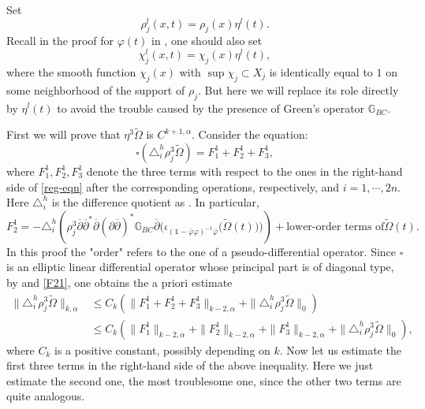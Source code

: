 \documentclass[12pt]{amsart}
\numberwithin{equation}{section}
\renewcommand{\1}{\mathds{1}}
\newcommand{\G}{\mathbb{G}}
\newcommand{\db}{\overline{\partial}}
\renewcommand{\>}{\rightarrow}
\newcommand{\p}{\partial}
\def\p{\partial}
\def\b{\bar}
\begin{document}
Set
\begin{equation}\label{ro-eta}
\rho_j^l(x,t)=\rho_j(x)\eta^l(t).
\end{equation}
Recall in the proof for $\varphi(t)$ in \cite[Appendix.\S 8]{k}, one
should also set
$$\chi_j^l(x,t)=\chi_j(x)\eta^l(t),$$
where the smooth function $\chi_j(x)$ with $\sup\chi_j\subset X_j$
is identically equal to $1$ on some neighborhood of the support of
$\rho_j$. But here we will replace its role directly by $\eta^l(t)$
to avoid the trouble caused by the presence of Green's operator
$\G_{BC}$.


First we will prove that $\eta^3\tilde{\Omega}$ is $C^{k+1,\alpha}$.
Consider the equation:
\begin{equation}\label{F21}
\square(\triangle^h_i\rho_j^3\tilde{\Omega})
 =F_1^1+F_2^1+F_3^1,
\end{equation}
where $F_1^1,F_2^1,F_3^1$ denote the three terms with respect to the
ones in the right-hand side of \eqref{reg-eqn} after the
corresponding operations, respectively, and $i=1,\cdots, 2n$. Here
$\triangle^h_i$ is the difference quotient as
\cite[Appendix.(8.14)]{k}. In particular,
$$F_2^1=-\triangle^h_i\left(\rho_j^3\db \db^*\db(\p\db)^* \G_{BC} \db
\Big( \iota_{(\1-\b{\varphi}\varphi)^{-1}\b{\varphi}} \big(
\tilde{\Omega}(t) \big) \Big)\right)+\text{lower-order terms of
$\tilde{\Omega}(t)$}.$$ In this proof the "order" refers to the one of a
pseudo-differential operator. Since $\square$ is an elliptic linear
differential operator whose principal part is of diagonal type, by
\cite[Appendix.Theorem 2.3]{k} and \eqref{F21}, one obtains the a
priori estimate
\begin{equation}\label{4-ck}
\begin{aligned}
\|\triangle^h_i\rho_j^3\tilde{\Omega}\|_{k, \alpha}
 &\leq C_k(\|
F_1^1+F_2^1+F_3^1 \|_{k-2,
\alpha}+\|\triangle^h_i\rho_j^3\tilde{\Omega}\|_{0})\\
 &\leq C_k(\|
F_1^1\|_{k-2, \alpha}+\| F_2^1\|_{k-2, \alpha}+\| F_3^1 \|_{k-2,
\alpha}+\|\triangle^h_i\rho_j^3\tilde{\Omega}\|_{0}),
\end{aligned}
\end{equation}
where $C_k$ is a positive constant, possibly depending on $k$. Now
let us estimate the first three terms in the right-hand side of the
above inequality. Here we just estimate the second one, the most
troublesome one, since the other two terms are quite analogous.
\end{document}

